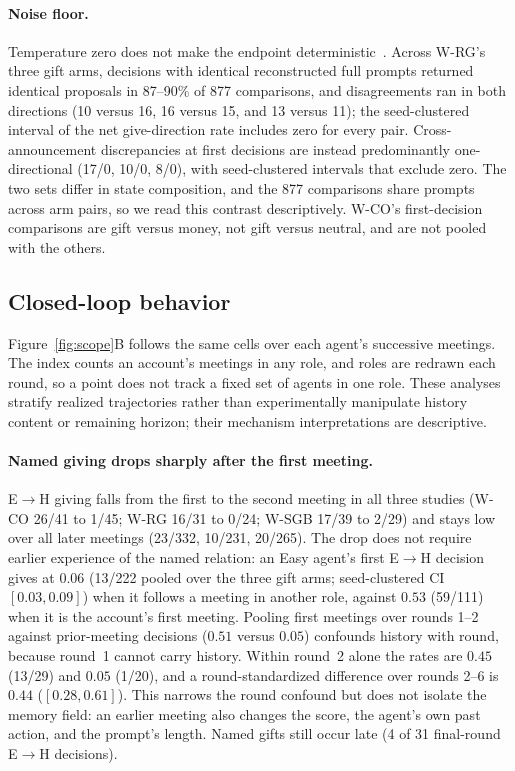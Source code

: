 \documentclass[sigconf,anonymous]{aamas}
\begin{document}
\paragraph{Noise floor.}  Temperature zero does not make the endpoint
deterministic~\cite{atil2025nondeterminism}.  Across W-RG's three gift arms,
decisions with identical reconstructed full prompts returned identical proposals in
87--90\% of 877 comparisons, and disagreements ran in both directions (10
versus 16, 16 versus 15, and 13 versus 11); the seed-clustered interval of the
net give-direction rate includes zero for every pair.  Cross-announcement
discrepancies at first decisions are instead predominantly one-directional
(17/0, 10/0, 8/0), with seed-clustered intervals that exclude zero.  The two
sets differ in state composition, and the 877 comparisons share prompts across
arm pairs, so we read this contrast descriptively.  W-CO's first-decision
comparisons are gift versus money, not gift versus neutral, and are not pooled
with the others.

\subsection{Closed-loop behavior}
\label{sec:dynamics}

Figure~\ref{fig:scope}B follows the same cells over each agent's successive
meetings.  The index counts an account's meetings in any role, and roles are
redrawn each round, so a point does not track a fixed set of agents in one role.
These analyses stratify realized trajectories rather than experimentally
manipulate history content or remaining horizon; their mechanism
interpretations are descriptive.

\paragraph{Named giving drops sharply after the first meeting.}  E$\rightarrow$H
giving falls from the first to the second meeting in all three studies (W-CO
26/41 to 1/45; W-RG 16/31 to 0/24; W-SGB 17/39 to 2/29) and stays low over all
later meetings (23/332, 10/231, 20/265).  The drop does not require earlier
experience of the named relation: an Easy agent's first E$\rightarrow$H decision
gives at $0.06$ (13/222 pooled over the three gift arms; seed-clustered CI
$[0.03,0.09]$) when it follows a meeting in another role, against $0.53$
(59/111) when it is the account's first meeting.  Pooling first meetings over
rounds 1--2 against prior-meeting decisions ($0.51$ versus $0.05$) confounds
history with round, because round~1 cannot carry history.  Within round~2 alone
the rates are $0.45$ (13/29) and $0.05$ (1/20), and a round-standardized
difference over rounds 2--6 is $0.44$ ($[0.28,0.61]$).  This narrows the round
confound but does not isolate the memory field: an earlier meeting also changes
the score, the agent's own past action, and the prompt's length.  Named gifts
still occur late (4 of 31 final-round E$\rightarrow$H decisions).
\end{document}
